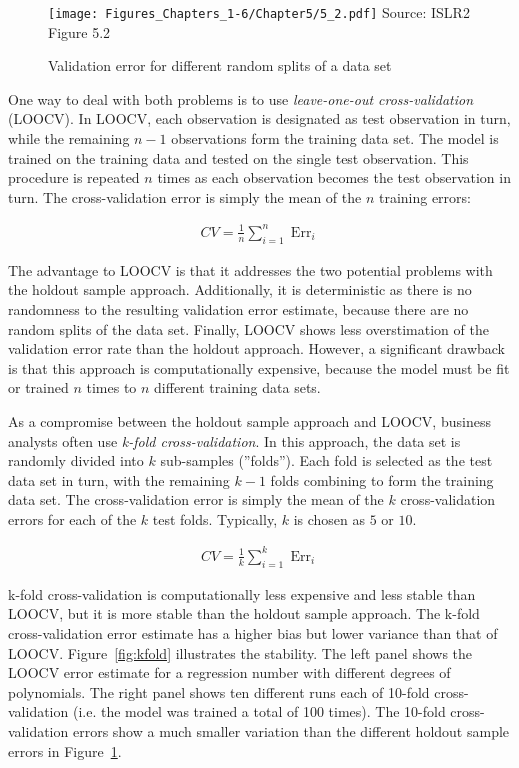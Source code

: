 \begin{figure}[b]
\centering 

\texttt{[image: Figures\_Chapters\_1-6/Chapter5/5\_2.pdf]}
\scriptsize Source: ISLR2 Figure 5.2
\caption{Validation error for different random splits of a data set}
\label{fig:holdout}
\end{figure}

One way to deal with both problems is to use \emph{leave-one-out cross-validation} (LOOCV). In LOOCV, each observation is designated as test observation in turn, while the remaining $n-1$ observations form the training data set. The model is trained on the training data and tested on the single test observation. This procedure is repeated $n$ times as each observation becomes the test observation in turn. The cross-validation error is simply the mean of the $n$ training errors:

\begin{align*}
CV = \frac{1}{n} \sum\nolimits_{i=1}^n \operatorname{Err}_i
\end{align*}

The advantage to LOOCV is that it addresses the two potential problems with the holdout sample approach. Additionally, it is deterministic as there is no randomness to the resulting validation error estimate, because there are no random splits of the data set. Finally, LOOCV shows less overstimation of the validation error rate than the holdout approach. However, a significant drawback is that this approach is computationally expensive, because the model must be fit or trained $n$ times to $n$ different training data sets. 

As a compromise between the holdout sample approach and LOOCV, business analysts often use \emph{k-fold cross-validation}. In this approach, the data set is randomly divided into $k$ sub-samples (''folds''). Each fold is selected as the test data set in turn, with the remaining $k-1$ folds combining to form the training data set. The cross-validation error is simply the mean of the $k$ cross-validation errors for each of the $k$ test folds. Typically, $k$ is chosen as $5$ or $10$.

\begin{align*}
CV = \frac{1}{k} \sum\nolimits_{i=1}^k \operatorname{Err}_i
\end{align*}

k-fold cross-validation is computationally less expensive and less stable than LOOCV, but it is more stable than the holdout sample approach. The k-fold cross-validation error estimate has a higher bias but lower variance than that of LOOCV. Figure~\ref{fig:kfold} illustrates the stability. The left panel shows the LOOCV error estimate for a regression number with different degrees of polynomials. The right panel shows ten different runs each of 10-fold cross-validation (i.e. the model was trained a total of 100 times). The 10-fold cross-validation errors show a much smaller variation than the different holdout sample errors in Figure~\ref{fig:holdout}.

